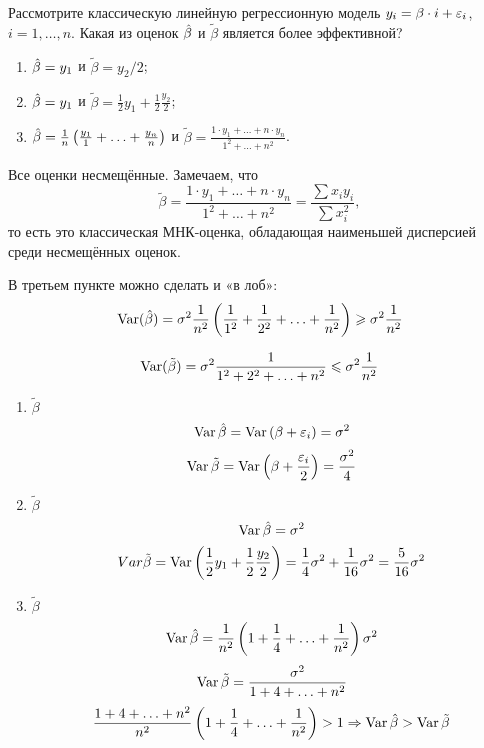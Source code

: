 \begin{problem}
Рассмотрите классическую линейную регрессионную модель $y_i = \beta \cdot i + \varepsilon_i$, $i=1, \ldots, n$. Какая из оценок $\hat{\beta}$ и $\tilde{\beta}$ является более эффективной?

\begin{enumerate}
\item $\hat{\beta} = y_1$ и $\tilde{\beta} = y_2/2$;
\item $\hat{\beta} = y_1$ и $\tilde{\beta} = \frac{1}{2} y_1 + \frac{1}{2} \frac{y_2}{2}$;
\item $\hat{\beta} = \frac{1}{n} \left(  \frac{y_1}{1} + \ldots + \frac{y_n}{n} \right) $ и $\tilde{\beta} = \frac{1 \cdot y_1 + \ldots + n \cdot y_n}{1^2 + \ldots + n^2}$.
\end{enumerate}


\begin{sol}
Все оценки несмещённые. Замечаем, что
\[
\tilde{\beta} = \frac{1 \cdot y_1 + \ldots + n \cdot y_n}{1^2 + \ldots + n^2}=\frac{\sum x_i y_i}{\sum x_i^2},
\]
то есть это классическая МНК-оценка, обладающая наименьшей дисперсией среди несмещённых оценок.

В третьем пункте можно сделать и «в лоб»:
\[
\operatorname{Var}(\hat{\beta})=\sigma^2 \frac{1}{n^2}\left(\frac{1}{1^2} + \frac{1}{2^2} + \ldots + \frac{1}{n^2} \right) \geqslant \sigma^2 \frac{1}{n^2}
\]

\[
\operatorname{Var}(\tilde{\beta})=\sigma^2 \frac{1}{1^2+2^2+ \ldots + n^2} \leqslant \sigma^2 \frac{1}{n^2}
\]

\begin{enumerate}
\item \(\tilde{\beta}\)
\[\operatorname{Var} \hat{\beta} = \operatorname{Var} \left(\beta + \varepsilon_i \right) = \sigma^2 \]
\[\operatorname{Var} \tilde{\beta} = \operatorname{Var} \left(\beta + \frac{\varepsilon_i}{2} \right)= \frac{\sigma^2}{4} \]
\item \(\tilde{\beta}\)
\[\operatorname{Var} \hat{\beta} = \sigma^2 \]
\[Var \tilde{\beta} = \operatorname{Var} \left(\frac{1}{2} y_1 + \frac{1}{2} \frac{y_2}{2} \right) = \frac{1}{4} \sigma^2 + \frac{1}{16} \sigma^2 = \frac{5}{16} \sigma^2\]
\item \(\tilde{\beta}\)
\[\operatorname{Var} \hat{\beta} = \frac{1}{n^2} \left(1 + \frac{1}{4} + \ldots + \frac{1}{n^2} \right) \sigma^2 \]
\[\operatorname{Var} \tilde{\beta} = \frac{\sigma^2}{1 + 4 + \ldots + n^2} \]
\[\frac{1 + 4 + \ldots + n^2}{n^2} \left(1 + \frac{1}{4} + \ldots + \frac{1}{n^2} \right) > 1 \Rightarrow \operatorname{Var} \hat{\beta} > \operatorname{Var} \tilde{\beta}\]
\end{enumerate}

\end{sol}
\end{problem}



